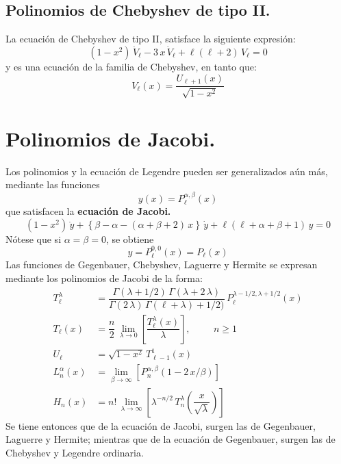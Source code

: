 \subsection{Polinomios de Chebyshev de tipo II.}
La ecuación de Chebyshev de tipo II, satisface la siguiente expresión:
\begin{equation}
(1 - x^{2}) \, \ddot{V}_{\ell} - 3 \, x \, \dot{V}_{\ell} + \ell (\ell + 2) \, V_{\ell} = 0
\label{eq:ecuacion_08_89}
\end{equation}
y es una ecuación de la familia de Chebyshev, en tanto que:
\begin{equation}
V_{\ell} (x) = \dfrac{U_{\ell+1}(x)}{\sqrt{1 - x^{2}}}
\label{eq:ecuacion_08_90}
\end{equation}
\section{Polinomios de Jacobi.}
Los polinomios y la ecuación de Legendre pueden ser generalizados aún más, mediante las funciones
\[y(x) = P_{\ell}^{\alpha, \beta} (x) \]
que satisfacen la \textbf{ecuación de Jacobi.}
\[ (1 - x^{2}) \, \ddot{y} + \left\{ \beta - \alpha - (\alpha + \beta + 2) \, x \right\} \, \dot{y} + \ell (\ell + \alpha + \beta + 1) \, y = 0 \]
Nótese que si $\alpha = \beta = 0$, se obtiene
\[ y = P_{\ell}^{0,0} (x) = P_{\ell}(x) \]
Las funciones de Gegenbauer, Chebyshev, Laguerre y Hermite se expresan mediante los polinomios de Jacobi de la forma:
\begin{align*}
T_{\ell}^{\lambda} &= \dfrac{\Gamma (\lambda + 1/2) \, \Gamma (\lambda + 2 \, \lambda)}{\Gamma (2 \, \lambda) \, \Gamma (\ell + \lambda) + 1/2)} \, P_{\ell}^{\lambda-1/2, \lambda+1/2} (x) \\[1em]
T_{\ell}(x) &= \dfrac{n}{2} \, \lim_{\lambda \to 0} \left[ \dfrac{T_{\ell}^{\lambda}(x)}{\lambda} \right], \hspace{1cm} n \geq 1 \\[1em]
U_{\ell} &= \sqrt{1 - x^{2}} \, T_{\ell-1}^{1} (x) \\[1em]
L_{n}^{\alpha} (x) &= \lim_{\beta \to \infty} \left[ P_{n}^{\alpha, \beta} (1 - 2 \, x / \beta) \right] \\[1em]
H_{n}(x) &= n! \, \lim_{\lambda \to \infty} \left[ \lambda^{-n/2} \, T_{n}^{\lambda} \left( \dfrac{x}{\sqrt{\lambda}} \right) \right]
\end{align*}
Se tiene entonces que de la ecuación de Jacobi, surgen las de Gegenbauer, Laguerre y Hermite; mientras que de la ecuación de Gegenbauer, surgen las de Chebyshev y Legendre ordinaria.
